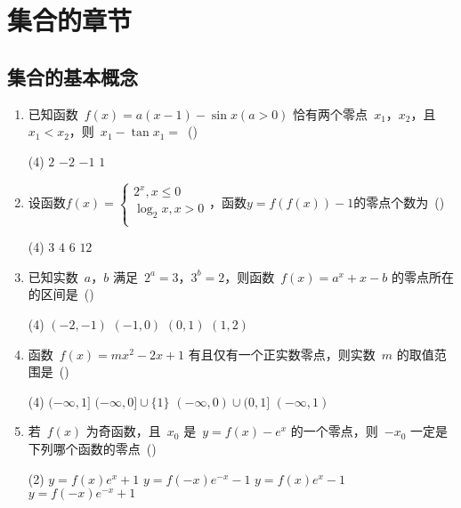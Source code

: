 \documentclass[UTF8,twoside,openright]{ctexbook}
\newcommand{\hfquan}[1]{\raisebox{-0.05em}{\koz\CIDtextblackboxed{#1}}}
\newenvironment{zuoye}{
\begin{enumerate}
[
labelindent=0mm,
align=left,
labelwidth=1.5em,
itemsep=2em,
labelsep=0em,
leftmargin=1.5em,
label={\textcolor{cyan}{\hfquan{\arabic*}}}]
}
{\end{enumerate}}
\begin{document}
\pagecolor{mybackground}

\chapter{集合的章节}

\section{集合的基本概念}

\begin{zuoye}

    \item 已知函数~$f(x)=a(x-1)-\sin x(a>0)$ 恰有两个零点~$x_{1} $，$x_{2} $，且~$x_{1} <x_{2} $，则~$x_{1} -\tan x_{1} =$~(\quad)
\begin{tasks}(4)
    \task $2$ \task $-2$ \task $-1$ \task $1$
\end{tasks}

\item 设函数$f(x)=
\begin{cases}
{2^{x},x\leq 0} \\
 {\log_{2} x,x>0} \\
\end{cases}
$，函数$y=f(f(x))-1$的零点个数为~(\quad)
\begin{tasks}(4)
    \task $3$ \task $4$ \task $6$ \task $12$
\end{tasks}

\item 已知实数~$a$，$b$ 满足~$2^{a}=3$，$3^{b}=2$，则函数~$f(x)=a^{x}+x-b$ 的零点所在的区间是~(\quad)
\begin{tasks}(4)
    \task $(-2, -1)$ \task $(-1,0)$ \task $(0,1)$ \task $(1,2)$
\end{tasks}

\item 函数~$f(x)=mx^{2}-2x+1$ 有且仅有一个正实数零点，则实数~$m$ 的取值范围是~(\quad)
\begin{tasks}(4)
    \task $(-\infty, 1]$ \task $(-\infty, 0] \cup \{1\}$ \task $(-\infty,0)\cup (0,1]$ \task $(-\infty,1)$
\end{tasks}

\item 若~$f(x)$ 为奇函数，且~$x_{0} $ 是~$y=f(x)-e^{x}$ 的一个零点，则~$-x_{0}
$ 一定是下列哪个函数的零点~(\quad)
\begin{tasks}(2)
    \task $y=f(x)e^{x}+1$ \task $y=f(-x)e^{-x}-1$
    \task $y=f(x)e^{x}-1$ \task $y=f(-x)e^{-x}+1$
\end{tasks}


\end{zuoye}
\end{document}
